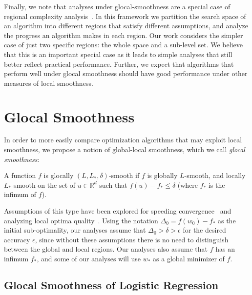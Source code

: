 \documentclass[10pt]{article} %
\begin{document}
Finally, we note that analyses under glocal-smoothness are a special case of regional complexity analysis~\cite{CurtisR21}. In this framework we partition the search space of an algorithm into different regions that satisfy different assumptions, and analyze the progress an algorithm makes in each region. Our work considers the simpler case of just two specific regions: the whole space and a sub-level set. We believe that this is an important special case as it leads to simple analyses that still better reflect practical performance. Further, we expect that algorithms that perform well under glocal smoothness should have good performance under other measures of local smoothness.


\section{Glocal Smoothness}\label{glocal-setting}
In order to more easily compare optimization algorithms that may exploit local smoothness, we propose a notion of global-local smoothness, which we call \textit{glocal smoothness}:
\begin{definition}
    \label{glocal-smoothness}
    A function $f$ is glocally $(L,L_*, \delta)$-smooth if $f$ is globally $L$-smooth, and locally $L_*$-smooth on the set of $u \in \mathbb{R}^d$ such that $f(u) - f_* \leq \delta$ (where $f_*$ is the infimum of $f$).
\end{definition}
Assumptions of this type have been explored for speeding convergence~\cite{VainsencherLZ15} and analyzing local optima quality~\cite{mohtashami2023special}. Using the notation $\Delta_{0} = f(w_{0}) - f_{*}$ as the initial sub-optimality, our analyses assume that $\Delta_0 > \delta > \epsilon$ for the desired accuracy $\epsilon$, since without these assumptions there is no need to distinguish between the global and local regions. Our analyses also assume that $f$ has an infimum $f_*$, and some of our analyses will use $w_*$ as a global minimizer of $f$.

\subsection{Glocal Smoothness of Logistic Regression}
\label{sec:logReg}
\end{document}
